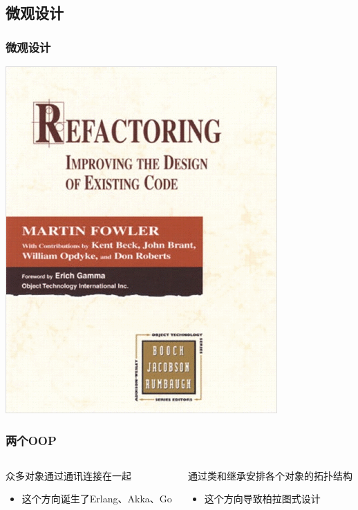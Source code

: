 \documentclass[UTF8,lualatex]{ctexbeamer}
\begin{document}
\subsection{微观设计}

\begin{frame}
    \frametitle{微观设计}
    \begin{center}
        \includegraphics[height=0.7\textheight]{refactor.png}
    \end{center}
\end{frame}

\begin{frame}
    \frametitle{两个OOP}
    \begin{columns}[t]
        \begin{column}{0.45\textwidth}
            \begin{block}{众多对象通过通讯连接在一起}
                \begin{itemize}
                    \item 这个方向诞生了Erlang、Akka、Go
                \end{itemize}
            \end{block}
        \end{column}
        \begin{column}{0.45\textwidth}
            \begin{block}{通过类和继承安排各个对象的拓扑结构}
                \begin{itemize}
                    \item 这个方向导致柏拉图式设计
                \end{itemize}
            \end{block}
        \end{column}
    \end{columns}
\end{frame}
\end{document}
